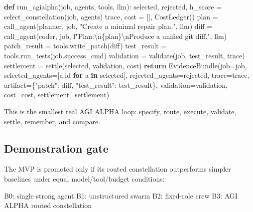 \documentclass[11pt]{article}
\newenvironment{Shaded}{}{}
\newcommand{\BuiltInTok}[1]{\textcolor[rgb]{0.00,0.50,0.00}{#1}}
\newcommand{\CharTok}[1]{\textcolor[rgb]{0.25,0.44,0.63}{#1}}
\newcommand{\ControlFlowTok}[1]{\textcolor[rgb]{0.00,0.44,0.13}{\textbf{#1}}}
\newcommand{\KeywordTok}[1]{\textcolor[rgb]{0.00,0.44,0.13}{\textbf{#1}}}
\newcommand{\NormalTok}[1]{#1}
\newcommand{\OperatorTok}[1]{\textcolor[rgb]{0.40,0.40,0.40}{#1}}
\newcommand{\SpecialCharTok}[1]{\textcolor[rgb]{0.25,0.44,0.63}{#1}}
\newcommand{\SpecialStringTok}[1]{\textcolor[rgb]{0.73,0.40,0.53}{#1}}
\newcommand{\StringTok}[1]{\textcolor[rgb]{0.25,0.44,0.63}{#1}}
\begin{document}
\begin{Shaded}
\begin{Highlighting}[]
\KeywordTok{def}\NormalTok{ run\_agialpha(job, agents, tools, llm):}
\NormalTok{    selected, rejected, h\_score }\OperatorTok{=}\NormalTok{ select\_constellation(job, agents)}
\NormalTok{    trace, cost }\OperatorTok{=}\NormalTok{ [], CostLedger()}
\NormalTok{    plan }\OperatorTok{=}\NormalTok{ call\_agent(planner, job, }\StringTok{"Create a minimal repair plan."}\NormalTok{, llm)}
\NormalTok{    diff }\OperatorTok{=}\NormalTok{ call\_agent(coder, job, }\SpecialStringTok{f"Plan:}\CharTok{\textbackslash{}n}\SpecialCharTok{\{}\NormalTok{plan}\SpecialCharTok{\}}\CharTok{\textbackslash{}n}\SpecialStringTok{Produce a unified git diff."}\NormalTok{, llm)}
\NormalTok{    patch\_result }\OperatorTok{=}\NormalTok{ tools.write\_patch(diff)}
\NormalTok{    test\_result }\OperatorTok{=}\NormalTok{ tools.run\_tests(job.success\_cmd)}
\NormalTok{    validation }\OperatorTok{=}\NormalTok{ validate(job, test\_result, trace)}
\NormalTok{    settlement }\OperatorTok{=}\NormalTok{ settle(selected, validation, cost)}
    \ControlFlowTok{return}\NormalTok{ EvidenceBundle(job}\OperatorTok{=}\NormalTok{job, selected\_agents}\OperatorTok{=}\NormalTok{[a.}\BuiltInTok{id} \ControlFlowTok{for}\NormalTok{ a }\KeywordTok{in}\NormalTok{ selected],}
\NormalTok{                          rejected\_agents}\OperatorTok{=}\NormalTok{rejected, trace}\OperatorTok{=}\NormalTok{trace,}
\NormalTok{                          artifact}\OperatorTok{=}\NormalTok{\{}\StringTok{"patch"}\NormalTok{: diff, }\StringTok{"test\_result"}\NormalTok{: test\_result\},}
\NormalTok{                          validation}\OperatorTok{=}\NormalTok{validation, cost}\OperatorTok{=}\NormalTok{cost, settlement}\OperatorTok{=}\NormalTok{settlement)}
\end{Highlighting}
\end{Shaded}

This is the smallest real AGI ALPHA loop: specify, route, execute,
validate, settle, remember, and compare.

\subsection{Demonstration gate}\label{demonstration-gate}

The MVP is promoted only if its routed constellation outperforms simpler
baselines under equal model/tool/budget conditions:

\begin{Shaded}
\begin{Highlighting}[]
\NormalTok{B0: single strong agent}
\NormalTok{B1: unstructured swarm}
\NormalTok{B2: fixed{-}role crew}
\NormalTok{B3: AGI ALPHA routed constellation}
\end{Highlighting}
\end{Shaded}
\end{document}

